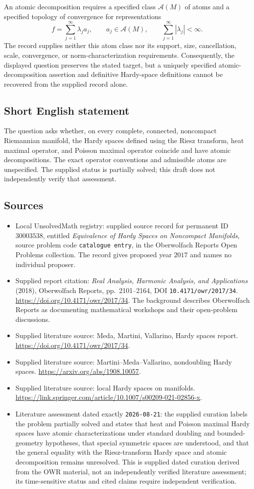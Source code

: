 \documentclass[11pt]{article}
\begin{document}
An atomic decomposition requires a specified class \(\mathcal A(M)\) of atoms and a specified topology of convergence for representations
\[
f=\sum_{j=1}^{\infty}\lambda_j a_j,
\qquad a_j\in\mathcal A(M),\qquad
\sum_{j=1}^{\infty}|\lambda_j|<\infty.
\]
The record supplies neither this atom class nor its support, size, cancellation, scale, convergence, or norm-characterization requirements. Consequently, the displayed question preserves the stated target, but a uniquely specified atomic-decomposition assertion and definitive Hardy-space definitions cannot be recovered from the supplied record alone.
\subsection{Short English statement}
The question asks whether, on every complete, connected, noncompact Riemannian manifold, the Hardy spaces defined using the Riesz transform, heat maximal operator, and Poisson maximal operator coincide and have atomic decompositions. The exact operator conventions and admissible atoms are unspecified. The supplied status is partially solved; this draft does not independently verify that assessment.
\subsection{Sources}
\begin{itemize}
\item Local UnsolvedMath registry: supplied source record for permanent ID \(30003538\), entitled \emph{Equivalence of Hardy Spaces on Noncompact Manifolds}, source problem code \texttt{catalogue entry}, in the Oberwolfach Reports Open Problems collection. The record gives proposed year \(2017\) and names no individual proposer.
\item Supplied report citation: \emph{Real Analysis, Harmonic Analysis, and Applications} (2018), Oberwolfach Reports, pp.\ 2101--2164, DOI \texttt{10.4171/owr/2017/34}. \url{https://doi.org/10.4171/owr/2017/34}. The background describes Oberwolfach Reports as documenting mathematical workshops and their open-problem discussions.
\item Supplied literature source: Meda, Martini, Vallarino, Hardy spaces report. \url{https://doi.org/10.4171/owr/2017/34}.
\item Supplied literature source: Martini--Meda--Vallarino, nondoubling Hardy spaces. \url{https://arxiv.org/abs/1908.10057}.
\item Supplied literature source: local Hardy spaces on manifolds. \url{https://link.springer.com/article/10.1007/s00209-021-02856-x}.
\item Literature assessment dated exactly \texttt{2026-08-21}: the supplied curation labels the problem partially solved and states that heat and Poisson maximal Hardy spaces have atomic characterizations under standard doubling and bounded-geometry hypotheses, that special symmetric spaces are understood, and that the general equality with the Riesz-transform Hardy space and atomic decomposition remains unresolved. This is supplied dated curation derived from the OWR material, not an independently verified literature assessment; its time-sensitive status and cited claims require independent verification.
\end{itemize}
\end{document}
